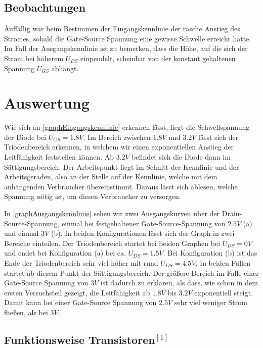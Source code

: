 \documentclass[11pt, a4paper]{article}
\begin{document}
\subsection*{Beobachtungen}
Âuffällig war beim Bestimmen der Eingangskennlinie der rasche Anstieg des Stromes, sobald die Gate-Source Spannung eine gewisse Schwelle erreicht hatte.
Im Fall der Ausgangskennlinie ist zu bemerken, dass die Höhe, auf die sich der Strom bei höherem $U_{DS}$ einpendelt, scheinbar von der konstant gehaltenen Spannung $U_{GS}$ abhängt.
\section*{Auswertung}
Wie sich an \autoref{graphEingangskennlinie} erkennen lässt, liegt die Schwellspannung der Diode bei $U_{GS} = 1.8V$. Im Bereich zwischen $1.8V$ und $3.2V$ lässt sich der Triodenbereich erkennen, in welchem wir einen exponentiellen Anstieg der Leitfähigkeit feststellen können. Ab $3.2V$ befindet sich die Diode dann im Sättigungsbereich. Der Arbeitspunkt liegt im Schnitt der Kennlinie und der Arbeitsgeraden, also an der Stelle auf der Kennlinie, welche mit dem anhängenden Verbraucher übereinstimmt. Daraus lässt sich ablesen, welche Spannung nötig ist, um diesen Verbraucher zu versorgen.

In \autoref{graphAusgangskennlinie} sehen wir zwei Ausgangskurven über der Drain-Source-Spannung, einmal bei festgehaltener Gate-Source-Spannung von $2.5V$ (a) und einmal $3V$ (b). In beiden Konfigurationen lässt sich der Graph in zwei Bereiche einteilen. Der Triodenbereich startet bei beiden Graphen bei $U_{DS} = 0 V$ und endet bei Konfiguration (a) bei ca. $U_{DS} = 1.5 V$. Bei Konfiguration (b) ist das Ende der Triodenbereich sehr viel höher mit rund $U_{DS} = 4.5 V$. In beiden Fällen startet ab diesem Punkt der Sättigungsbereich. Der größere Bereich im Falle einer Gate-Source Spannung von $3 V$ ist dadurch zu erklären, als dass, wie schon in dem ersten Versuchsteil gezeigt, die Leitfähigkeit ab $1.8 V$ bis $3.2 V$ exponentiell steigt. Damit kann bei einer Gate-Source Spannung von $2.5 V$ sehr viel weniger Strom fließen, als bei $3 V$.

\subsection*{Funktionsweise Transistoren$^{[1]}$}
\label{transistoren_info}
\end{document}

